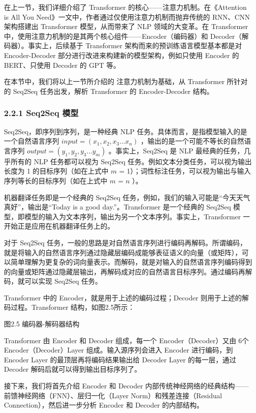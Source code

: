 \documentclass[
]{article}
\begin{document}
在上一节，我们详细介绍了 Transformer
的核心------注意力机制。在《Attention is All You
Need》一文中，作者通过仅使用注意力机制而抛弃传统的 RNN、CNN 架构搭建出
Transformer 模型，从而带来了 NLP 领域的大变革。在 Transformer
中，使用注意力机制的是其两个核心组件------Encoder（编码器）和
Decoder（解码器）。事实上，后续基于 Transformer
架构而来的预训练语言模型基本都是对 Encoder-Decoder
部分进行改进来构建新的模型架构，例如只使用 Encoder 的 BERT、只使用
Decoder 的 GPT 等。

在本节中，我们将以上一节所介绍的 注意力机制为基础，从 Transformer
所针对的 Seq2Seq 任务出发，解析 Transformer 的 Encoder-Decoder 结构。

\subsubsection{2.2.1 Seq2Seq 模型}\label{seq2seq-ux6a21ux578b}

Seq2Seq，即序列到序列，是一种经典 NLP
任务。具体而言，是指模型输入的是一个自然语言序列
\(input = (x_1, x_2, x_3...x_n)\) ，输出的是一个可能不等长的自然语言序列
\(output = (y_1, y_2, y_3...y_m)\) 。事实上，Seq2Seq 是 NLP
最经典的任务，几乎所有的 NLP 任务都可以视为 Seq2Seq
任务。例如文本分类任务，可以视为输出长度为 1 的目标序列（如在上式中
\(m\) =
1）；词性标注任务，可以视为输出与输入序列等长的目标序列（如在上式中
\(m\) = \(n\) ）。

机器翻译任务即是一个经典的 Seq2Seq
任务，例如，我们的输入可能是``今天天气真好''，输出是``Today is a good
day.''。Transformer 是一个经典的 Seq2Seq
模型，即模型的输入为文本序列，输出为另一个文本序列。事实上，Transformer
一开始正是应用在机器翻译任务上的。

对于 Seq2Seq
任务，一般的思路是对自然语言序列进行编码再解码。所谓编码，就是将输入的自然语言序列通过隐藏层编码成能够表征语义的向量（或矩阵），可以简单理解为更复杂的词向量表示。而解码，就是对输入的自然语言序列编码得到的向量或矩阵通过隐藏层输出，再解码成对应的自然语言目标序列。通过编码再解码，就可以实现
Seq2Seq 任务。

Transformer 中的 Encoder，就是用于上述的编码过程；Decoder
则用于上述的解码过程。Transformer 结构，如图2.5所示：

图2.5 编码器-解码器结构

Transformer 由 Encoder 和 Decoder 组成，每一个 Encoder（Decoder）又由
6个 Encoder（Decoder）Layer 组成。输入源序列会进入 Encoder 进行编码，到
Encoder Layer 的最顶层再将编码结果输出给 Decoder Layer 的每一层，通过
Decoder 解码后就可以得到输出目标序列了。

接下来，我们将首先介绍 Encoder 和 Decoder
内部传统神经网络的经典结构------前馈神经网络（FNN）、层归一化（Layer
Norm）和残差连接（Residual Connection），然后进一步分析 Encoder 和
Decoder 的内部结构。
\end{document}

